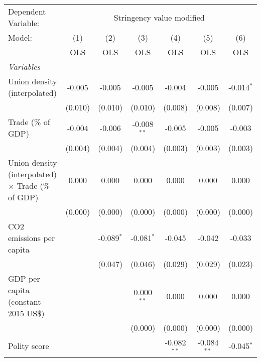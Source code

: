 
\begingroup
\centering
\begin{tabular}{lcccccc}
   \toprule
   Dependent Variable: & \multicolumn{6}{c}{Stringency value modified}\\
   Model:                                                    & (1)     & (2)          & (3)           & (4)           & (5)           & (6)\\  
                                                             &  OLS    & OLS          & OLS           & OLS           & OLS           & OLS\\  
   \midrule
   \emph{Variables}\\
   Union density (interpolated)                              & -0.005  & -0.005       & -0.005        & -0.004        & -0.005        & -0.014$^{*}$\\   
                                                             & (0.010) & (0.010)      & (0.010)       & (0.008)       & (0.008)       & (0.007)\\   
   Trade (\% of GDP)                                         & -0.004  & -0.006       & -0.008$^{**}$ & -0.005        & -0.005        & -0.003\\   
                                                             & (0.004) & (0.004)      & (0.004)       & (0.003)       & (0.003)       & (0.003)\\   
   Union density (interpolated) $\times$ Trade (\% of GDP)   & 0.000   & 0.000        & 0.000         & 0.000         & 0.000         & 0.000\\   
                                                             & (0.000) & (0.000)      & (0.000)       & (0.000)       & (0.000)       & (0.000)\\   
   CO2 emissions per capita                                  &         & -0.089$^{*}$ & -0.081$^{*}$  & -0.045        & -0.042        & -0.033\\   
                                                             &         & (0.047)      & (0.046)       & (0.029)       & (0.029)       & (0.023)\\   
   GDP per capita (constant 2015 US\$)                       &         &              & 0.000$^{**}$  & 0.000         & 0.000         & 0.000\\   
                                                             &         &              & (0.000)       & (0.000)       & (0.000)       & (0.000)\\   
   Polity score                                              &         &              &               & -0.082$^{**}$ & -0.084$^{**}$ & -0.045$^{*}$\\   

\end{tabular}
